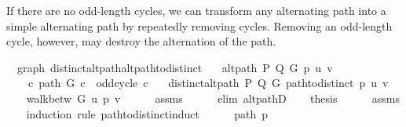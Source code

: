 \begin{isabellebody}
\begin{isamarkuptext}
If there are no odd-length cycles, we can transform any alternating path into a simple alternating
path by repeatedly removing cycles. Removing an odd-length cycle, however, may destroy the
alternation of the path.%
\end{isamarkuptext}\isamarkuptrue%
\isamarkupfalse%
\ {\isacharparenleft}{\kern0pt}\ graph{\isacharparenright}{\kern0pt}\ distinct{\isacharunderscore}{\kern0pt}alt{\isacharunderscore}{\kern0pt}path{\isacharunderscore}{\kern0pt}alt{\isacharunderscore}{\kern0pt}path{\isacharunderscore}{\kern0pt}to{\isacharunderscore}{\kern0pt}distinct{\isacharcolon}{\kern0pt}\isanewline
\ \ \ {\isachardoublequoteopen}alt{\isacharunderscore}{\kern0pt}path\ P\ Q\ G\ p\ u\ v{\isachardoublequoteclose}\isanewline
\ \ \ {\isachardoublequoteopen}{\isasymnot}\ {\isacharparenleft}{\kern0pt}{\isasymexists}c{\isachardot}{\kern0pt}\ path\ G\ c\ {\isasymand}\ odd{\isacharunderscore}{\kern0pt}cycle\ c{\isacharparenright}{\kern0pt}{\isachardoublequoteclose}\isanewline
\ \ \ {\isachardoublequoteopen}distinct{\isacharunderscore}{\kern0pt}alt{\isacharunderscore}{\kern0pt}path\ P\ Q\ G\ {\isacharparenleft}{\kern0pt}path{\isacharunderscore}{\kern0pt}to{\isacharunderscore}{\kern0pt}distinct\ p{\isacharparenright}{\kern0pt}\ u\ v{\isachardoublequoteclose}\isanewline
%
\isadelimproof
%
\endisadelimproof
%
\isatagproof
{}\isamarkupfalse%
\ {\isacharminus}{\kern0pt}\isanewline
\ \ \isamarkupfalse%
\ {\isachardoublequoteopen}walk{\isacharunderscore}{\kern0pt}betw\ G\ u\ p\ v{\isachardoublequoteclose}\isanewline
\ \ \ \ \isamarkupfalse%
\ assms{\isacharparenleft}{\kern0pt}{}{\isacharparenright}{\kern0pt}\isanewline
\ \ \ \ \isamarkupfalse%
\ {\isacharparenleft}{\kern0pt}elim\ alt{\isacharunderscore}{\kern0pt}pathD{\isacharparenleft}{\kern0pt}{}{\isacharparenright}{\kern0pt}{\isacharparenright}{\kern0pt}\isanewline
\ \ \isamarkupfalse%
\ {\isacharquery}{\kern0pt}thesis\isanewline
\ \ \ \ \isamarkupfalse%
\ assms\isanewline
\ \ \isamarkupfalse%
\ {\isacharparenleft}{\kern0pt}induction\ rule{\isacharcolon}{\kern0pt}\ path{\isacharunderscore}{\kern0pt}to{\isacharunderscore}{\kern0pt}distinct{\isacharunderscore}{\kern0pt}induct{\isacharparenright}{\kern0pt}\isanewline
\ \ \ \ \isamarkupfalse%
\ {\isacharparenleft}{\kern0pt}path\ p{\isacharparenright}{\kern0pt}\isanewline
\ \ \ \ \isamarkupfalse%

\end{isabellebody}
